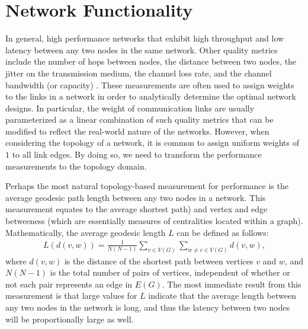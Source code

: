 \documentclass[doc]{apa}%
\begin{document}
\section{Network Functionality}
\label{NetworkFunctionality}

In general, high performance networks that exhibit high throughput and low latency between any two nodes in the same network. Other quality metrics include the number of hops between nodes, the distance between two nodes, the jitter on the transmission medium, the channel loss rate, and the channel bandwidth (or capacity) \cite{LargeNetworkRobustnessPVM}. These measurements are often used to assign weights to the links in a network in order to analytically determine the optimal network designs. In particular, the weight of communication links are usually parameterized as a linear combination of such quality metrics that can be modified to reflect the real-world nature of the networks. However, when considering the topology of a network, it is common to assign uniform weights of $1$ to all link edges. By doing so, we need to transform the performance measurements to the topology domain.

Perhaps the most natural topology-based measurement for performance is the average geodesic path length between any two nodes in a network. This measurement equates to the average shortest path) and vertex and edge betweeness (which are essentially measures of centralities located within a graph). Mathematically, the average geodesic length $L$ can be defined as follows:
\begin{eqnarray*}
L(d(v,w)) = \frac{1}{N(N-1)}\sum_{v \in V(G)}\sum_{w \not= v \in V(G)} d(v,w),
\end{eqnarray*}
where $d(v,w)$ is the distance of the shortest path between vertices $v$ and $w$, and $N(N-1)$ is the total number of pairs of vertices, independent of whether or not each pair represents an edge in $E(G)$. The most immediate result from this measurement is that large values for $L$ indicate that the average length between any two nodes in the network is long, and thus the latency between two nodes will be proportionally large as well. 
\end{document}
